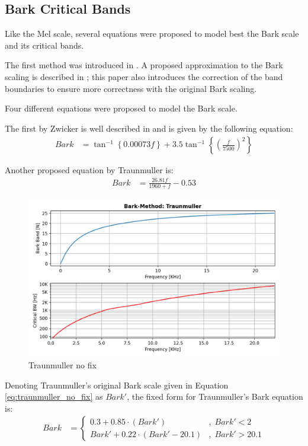 \subsection{Bark Critical Bands}
Like the Mel scale, several equations were proposed to model best
the Bark scale and its critical bands.

The first method was introduced in \cite{1908630}.
A proposed approximation to the Bark scaling is described in 
\cite{TraunmullerScale}; this paper also introduces the 
correction of the band boundaries to ensure more 
correctness with the original Bark scaling.

Four different equations were proposed to model
the Bark scale.

The first by Zwicker is well described in\cite{1908630} and
is given by the following equation:
\begin{align}%
    Bark & = \tan^{-1}\left\{ 0.00073f \right\} + 3.5 \tan^{-1}\left\{ 
            \left( \frac{f}{7500} \right)^{2}
        \right\}
\end{align}

Another proposed equation by Traunmuller \cite{TraunmullerScale} is:
\begin{align}\label{eq:traunmuller_no_fix}%
    Bark & = \frac{26.81f}{1960 + f} - 0.53
\end{align}

\begin{figure}[H]
    \centering
    \includegraphics[width=0.75\linewidth]{Experiments/images/Traunmuller_nofix}
    \caption{Traunmuller no fix}\label{fig:Traunmuller_nofix}
\end{figure}

Denoting Traunmuller's original
Bark scale given in Equation \ref{eq:traunmuller_no_fix} as \(Bark'\),
the fixed form for Traunmuller's Bark equation is:
\begin{align}
    Bark & = \begin{cases}
        0.3 + 0.85\cdot \left( Bark' \right) 
        &,\;Bark' < 2 \\
        Bark' + 0.22\cdot \left( Bark' - 20.1 \right) 
        &,\;Bark' > 20.1
    \end{cases}
\end{align}


